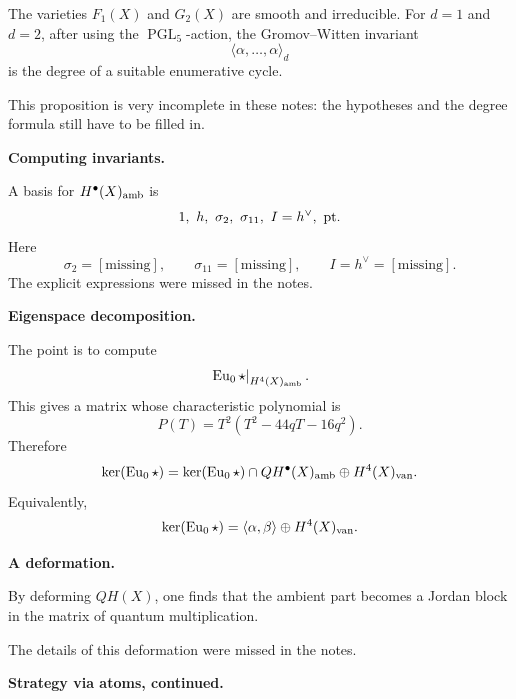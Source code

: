 \begin{proposition}[Enumerativity]
\label{proposition-varieties-f}
The varieties $F_1(X)$ and $G_2(X)$
are smooth and irreducible.
For $d=1$ and $d=2$, after using the
$\operatorname{PGL}_5$-action, the
Gromov--Witten invariant
\[
        \langle
        \alpha,\ldots,\alpha
        \rangle_d
\]
is the degree of a suitable
enumerative cycle.
\end{proposition}

\begin{remark}
\label{remark-proposition-very}
This proposition is very incomplete in
these notes: the hypotheses and the
degree formula still have to be
filled in.
\end{remark}

\medskip\noindent
{\bf Computing invariants.}

A basis for $H^\bullet(X)_{\rm amb}$
is
\[
        1,\ h,\ \sigma_2,\ \sigma_{11},
        \ I=h^\vee,\ {\rm pt}.
\]
Here
\[
        \sigma_2=[\text{missing}],
        \qquad
        \sigma_{11}=[\text{missing}],
        \qquad
        I=h^\vee=[\text{missing}].
\]
The explicit expressions were missed
in the notes.

\medskip\noindent
{\bf Eigenspace decomposition.}

The point is to compute
\[
        \left.
        \operatorname{Eu}_0\star
        \right|_{H^4(X)_{\rm amb}}.
\]
This gives a matrix whose
characteristic polynomial is
\[
        P(T)
        =
        T^2
        (T^2-44qT-16q^2).
\]
Therefore
\[
        \ker(\operatorname{Eu}_0\star)
        =
        \ker(\operatorname{Eu}_0\star)
        \cap QH^\bullet(X)_{\rm amb}
        \oplus H^4(X)_{\rm van}.
\]
Equivalently,
\[
        \ker(\operatorname{Eu}_0\star)
        =
        \langle\alpha,\beta\rangle
        \oplus H^4(X)_{\rm van}.
\]

\medskip\noindent
{\bf A deformation.}

By deforming $QH(X)$, one finds that
the ambient part becomes a Jordan
block in the matrix of quantum
multiplication.

\begin{remark}
\label{remark-details}
The details of this deformation were
missed in the notes.
\end{remark}

\medskip\noindent
{\bf Strategy via atoms, continued.}

